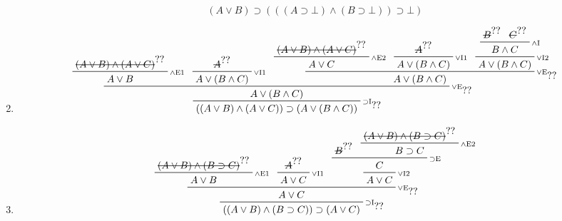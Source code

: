 \documentclass[11pt,dvipdfmx]{jreport}
\begin{document}
\begin{enumerate}
\begin{displaymath}
{ }
{(A \lor B) \supset (((A \supset \bot) \land (B \supset \bot)) \supset \bot)}
\end{displaymath}\vspace{.2ex}
 \item
\begin{displaymath}
\setcounter{prfassumptioncounter}{0}
\prftree[r]{$\scriptstyle\supset\mathrm{I}_{\prfref<assum:ABAC5>}$}
 {\prftree[r]{$\scriptstyle\lor\mathrm{E}_{\prfref<assum:ABorC5>}$}
  {\prftree[r]{$\scriptstyle\land\mathrm{E1}$}
   {\prfboundedstyle=1\prfboundedassumption<assum:ABAC5>{(A \lor B) \land (A \lor C)}}
   {A \lor B}
  }
  {\prftree[r]{$\scriptstyle\lor\mathrm{I1}$}
   {\prfboundedstyle=1\prfboundedassumption<assum:ABorC5>{A}}
   {A \lor (B \land C)}
  }
  {\prftree[r]{$\scriptstyle\lor\mathrm{E}_{\prfref<assum:AorC5>}$}
   {\prftree[r]{$\scriptstyle\land\mathrm{E2}$}
   {\prfboundedstyle=1\prfboundedassumption<assum:ABAC5>{(A \lor B) \land (A \lor C)}}
    {A \lor C}
   }
   {\prftree[r]{$\scriptstyle\lor\mathrm{I1}$}
    {\prfboundedstyle=1\prfboundedassumption<assum:AorC5>{A}}
    {A \lor (B \land C)}
   }
   {\prftree[r]{$\scriptstyle\lor\mathrm{I2}$}
    {\prftree[r]{$\scriptstyle\land\mathrm{I}$}
     {\prfboundedstyle=1\prfboundedassumption<assum:ABorC5>{B}}
     {\prfboundedstyle=1\prfboundedassumption<assum:AorC5>{C}}
     {B \land C}
    }
    {A \lor (B \land C)}
   }
   {A \lor (B \land C)}
  }
  {A \lor (B \land C)}
 }
{((A \lor B) \land (A \lor C)) \supset (A \lor (B \land C))}
\end{displaymath}\vspace{.2ex}
 \item
\begin{displaymath}
\setcounter{prfassumptioncounter}{0}
\prftree[r]{$\scriptstyle\supset\mathrm{I}_{\prfref<assum:ABBC6>}$}
 {\prftree[r]{$\scriptstyle\lor\mathrm{E}_{\prfref<assum:AorB6>}$}
  {\prftree[r]{$\scriptstyle\land\mathrm{E1}$}
   {\prfboundedstyle=1\prfboundedassumption<assum:ABBC6>{(A \lor B) \land (B \supset C)}}
   {A \lor B}
  }
  {\prftree[r]{$\scriptstyle\lor\mathrm{I1}$}
   {\prfboundedstyle=1\prfboundedassumption<assum:AorB6>{A}}
   {A \lor C}
  }
  {\prftree[r]{$\scriptstyle\lor\mathrm{I2}$}
   {\prftree[r]{$\scriptstyle\supset\mathrm{E}$}
    {\prfboundedstyle=1\prfboundedassumption<assum:AorB6>{B}}
    {\prftree[r]{$\scriptstyle\land\mathrm{E2}$}
     {\prfboundedstyle=1\prfboundedassumption<assum:ABBC6>{(A \lor B) \land (B \supset C)}}
     {B \supset C}
    }
    {C}
   }
   {A \lor C}
  }
  {A \lor C}
 }
{((A \lor B) \land (B \supset C)) \supset (A \lor C)}
\end{displaymath}\vspace{.2ex}
\end{enumerate}
\end{document}
